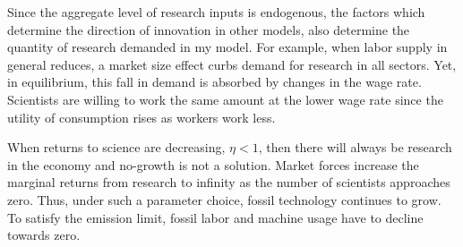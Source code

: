 Since the aggregate level of research inputs is endogenous, the factors which determine the direction of innovation in other models, also determine the quantity of research demanded in my model. For example, when labor supply in general reduces, a market size effect curbs demand for research in all sectors. %
Yet, in equilibrium, this fall in demand is absorbed by changes in the wage rate. 
Scientists are willing to work the same amount at the lower wage rate since the utility of consumption rises as workers work less.

When returns to science are decreasing, $\eta<1$, then there will always be research in the economy and no-growth is not a solution. Market forces increase the marginal returns from research to infinity as the number of scientists approaches zero. Thus, under such a parameter choice, fossil technology continues to grow. To satisfy the emission limit, fossil labor and machine usage have to decline towards zero. 



\begin{comment}
\paragraph{Impossibility of reaching target in laissez-faire with exogenous growth}
\tr{Note that this is wrong! There is an option for the gov to affect inflation which then redirects demand.}
Note that with exogenous growth in each sector there is no possibility for the government to stop emissions from growing, since production of the dirty good is essential for the consumption good (no perfect substitution: $\varepsilon<\infty$). To meet the emission target, the government either needs to affect the growth rate in the economy; i.e., $\upsilon_j$ is a choice variable, or work and consumption need to be set to zero; or the emission target has to be defined in relative terms. The latter possibility contradicts the Paris Agreement which is concerned with absolute emissions.  
I therefore assume, that the government can change the growth rate.

The government chooses the growth rate in each sector, taking into account that research is constrained by an exogenous  amount of scientists
\begin{align}
\upsilon_{ct}+\upsilon_{dt}\leq\Upsilon
\end{align}
\end{comment} 
  
